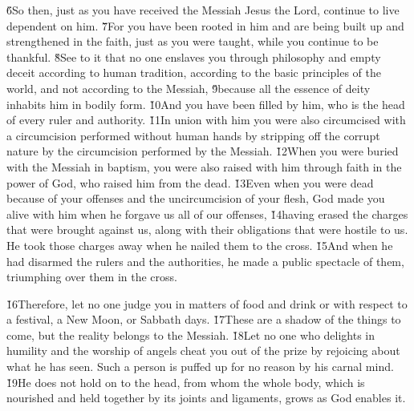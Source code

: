 \v{6}So then, just as you have received the Messiah Jesus the Lord, continue to live dependent on him. \v{7}For you have been rooted in him and are being built up and strengthened in the faith, just as you were taught, while you continue to be thankful. \v{8}See to it that no one enslaves you through philosophy and empty deceit according to human tradition, according to the basic principles of the world, and not according to the Messiah, \v{9}because all the essence of deity inhabits him in bodily form. \v{10}And you have been filled by him, who is the head of every ruler and authority. \v{11}In union with him you were also circumcised with a circumcision performed without human hands by stripping off the corrupt nature by the circumcision performed by the Messiah. \v{12}When you were buried with the Messiah in baptism, you were also raised with him through faith in the power of God, who raised him from the dead. \v{13}Even when you were dead because of your offenses and the uncircumcision of your flesh, God made you alive with him when he forgave us all of our offenses, \v{14}having erased the charges that were brought against us, along with their obligations that were hostile to us. He took those charges away when he nailed them to the cross. \v{15}And when he had disarmed the rulers and the authorities, he made a public spectacle of them, triumphing over them in the cross.

\v{16}Therefore, let no one judge you in matters of food and drink or with respect to a festival, a New Moon, or Sabbath days. \v{17}These are a shadow of the things to come, but the reality belongs to the Messiah. \v{18}Let no one who delights in humility and the worship of angels cheat you out of the prize by rejoicing about what he has seen. Such a person is puffed up for no reason by his carnal mind. \v{19}He does not hold on to the head, from whom the whole body, which is nourished and held together by its joints and ligaments, grows as God enables it.

